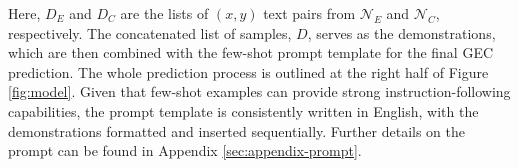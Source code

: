 Here, $D_E$ and $D_C$ are the lists of $(x, y)$ text pairs from $\mathcal{N}_E$ and $\mathcal{N}_C$, respectively. The concatenated list of samples, $D$, serves as the demonstrations, which are then combined with the few-shot prompt template for the final GEC prediction. The whole prediction process is outlined at the right half of Figure \ref{fig:model}. Given that few-shot examples can provide strong instruction-following capabilities, the prompt template is consistently written in English, with the demonstrations formatted and inserted sequentially. Further details on the prompt can be found in Appendix \ref{sec:appendix-prompt}.
